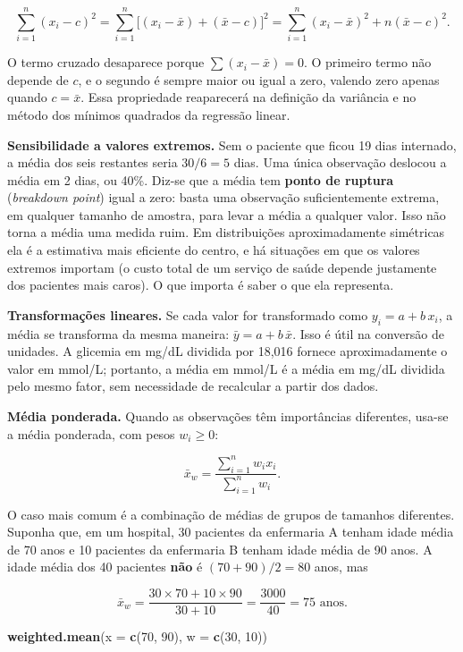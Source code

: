 \documentclass[
]{book}
\newenvironment{Shaded}{\begin{snugshade}}{\end{snugshade}}
\newcommand{\AttributeTok}[1]{\textcolor[rgb]{0.13,0.29,0.53}{#1}}
\newcommand{\DecValTok}[1]{\textcolor[rgb]{0.00,0.00,0.81}{#1}}
\newcommand{\FunctionTok}[1]{\textcolor[rgb]{0.13,0.29,0.53}{\textbf{#1}}}
\newcommand{\NormalTok}[1]{#1}
\begin{document}
\[
\sum_{i=1}^{n}(x_i - c)^2 = \sum_{i=1}^{n}\big[(x_i - \bar{x}) + (\bar{x} - c)\big]^2
= \sum_{i=1}^{n}(x_i - \bar{x})^2 + n(\bar{x} - c)^2 .
\]

O termo cruzado desaparece porque \(\sum (x_i - \bar{x}) = 0\). O primeiro termo não depende de \(c\), e o segundo é sempre maior ou igual a zero, valendo zero apenas quando \(c = \bar{x}\). Essa propriedade reaparecerá na definição da variância e no método dos mínimos quadrados da regressão linear.

\textbf{Sensibilidade a valores extremos.} Sem o paciente que ficou 19 dias internado, a média dos seis restantes seria \(30/6 = 5\) dias. Uma única observação deslocou a média em 2 dias, ou 40\%. Diz-se que a média tem \textbf{ponto de ruptura} (\emph{breakdown point}) igual a zero: basta uma observação suficientemente extrema, em qualquer tamanho de amostra, para levar a média a qualquer valor. Isso não torna a média uma medida ruim. Em distribuições aproximadamente simétricas ela é a estimativa mais eficiente do centro, e há situações em que os valores extremos importam (o custo total de um serviço de saúde depende justamente dos pacientes mais caros). O que importa é saber o que ela representa.

\textbf{Transformações lineares.} Se cada valor for transformado como \(y_i = a + b\,x_i\), a média se transforma da mesma maneira: \(\bar{y} = a + b\,\bar{x}\). Isso é útil na conversão de unidades. A glicemia em mg/dL dividida por 18,016 fornece aproximadamente o valor em mmol/L; portanto, a média em mmol/L é a média em mg/dL dividida pelo mesmo fator, sem necessidade de recalcular a partir dos dados.

\textbf{Média ponderada.} Quando as observações têm importâncias diferentes, usa-se a média ponderada, com pesos \(w_i \ge 0\):

\[
\bar{x}_w = \frac{\sum_{i=1}^{n} w_i x_i}{\sum_{i=1}^{n} w_i}.
\]

O caso mais comum é a combinação de médias de grupos de tamanhos diferentes. Suponha que, em um hospital, 30 pacientes da enfermaria A tenham idade média de 70 anos e 10 pacientes da enfermaria B tenham idade média de 90 anos. A idade média dos 40 pacientes \textbf{não} é \((70 + 90)/2 = 80\) anos, mas

\[
\bar{x}_w = \frac{30 \times 70 + 10 \times 90}{30 + 10} = \frac{3000}{40} = 75 \text{ anos}.
\]

\begin{Shaded}
\begin{Highlighting}[]
\FunctionTok{weighted.mean}\NormalTok{(}\AttributeTok{x =} \FunctionTok{c}\NormalTok{(}\DecValTok{70}\NormalTok{, }\DecValTok{90}\NormalTok{), }\AttributeTok{w =} \FunctionTok{c}\NormalTok{(}\DecValTok{30}\NormalTok{, }\DecValTok{10}\NormalTok{))}
\end{Highlighting}
\end{Shaded}
\end{document}
